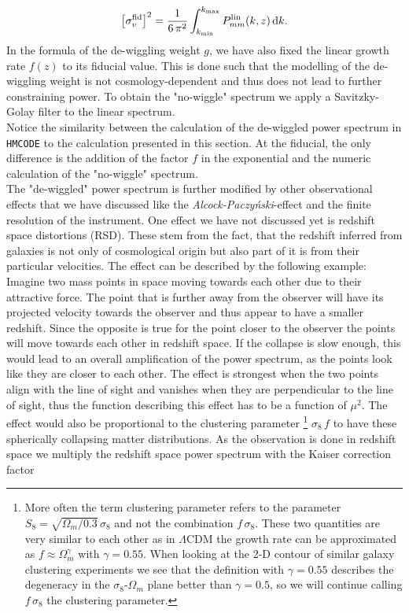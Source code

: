 \documentclass[../main.tex]{subfiles}
\begin{document}
\begin{equation}
    \left[\sigma_v^\mathrm{fid}\right]^2 = \frac{1}{6\,\pi^2} \int_{k_\mathrm{min}}^{k_\mathrm{max}} P^{\mathrm{lin}}_{mm}(k,z)\, \mathrm{d} k.
\end{equation} 
In the formula of the de-wiggling weight $g$, we have also fixed the linear growth rate $f(z)$ to its fiducial value. This is done such that the modelling of the de-wiggling weight is not cosmology-dependent and thus does not lead to further constraining power. To obtain the "no-wiggle" spectrum we apply a Savitzky-
Golay filter to the linear spectrum.\\
Notice the similarity between the calculation of the de-wiggled power spectrum in {\tt HMCODE} to the calculation presented in this section. At the fiducial, the only difference is the addition of the factor $f$ in the exponential and the numeric calculation of the "no-wiggle" spectrum.\\ 
The "de-wiggled" power spectrum is further modified by other observational effects that we have discussed like the \textit{Alcock-Paczyński}-effect and the finite resolution of the instrument. One effect we have not discussed yet is redshift space distortions (RSD). These stem from the fact, that the redshift inferred from galaxies is not only of cosmological origin but also part of it is from their particular velocities. The effect can be described by the following example: Imagine two mass points in space moving towards each other due to their attractive force. The point that is further away from the observer will have its projected velocity towards the observer and thus appear to have a smaller redshift. Since the opposite is true for the point closer to the observer the points will move towards each other in redshift space. If the collapse is slow enough, this would lead to an overall amplification of the power spectrum, as the points look like they are closer to each other. The effect is strongest when the two points align with the line of sight and vanishes when they are perpendicular to the line of sight, thus the function describing this effect has to be a function of $\mu^2$. The effect would also be proportional to the clustering parameter
\footnote{More often the term clustering parameter refers to the parameter $S_8 = \sqrt{\Omega_m/0.3}\, \sigma_8$ and not the combination $f\,\sigma_8$. These two quantities are very similar to each other as in $\Lambda$CDM the growth rate can be approximated as $f \approx \Omega_m^{\gamma}$ with $\gamma=0.55$. When looking at the 2-D contour of similar galaxy clustering experiments we see that the definition with $\gamma=0.55$ describes the degeneracy in the $\sigma_8$-$\Omega_m$ plane better than $\gamma=0.5$, so we will continue calling $f\,\sigma_8$ the clustering parameter.}
$\sigma_8\,f$ to have these spherically collapsing matter distributions. As the observation is done in redshift space we multiply the redshift space power spectrum with the Kaiser correction factor
\end{document}
